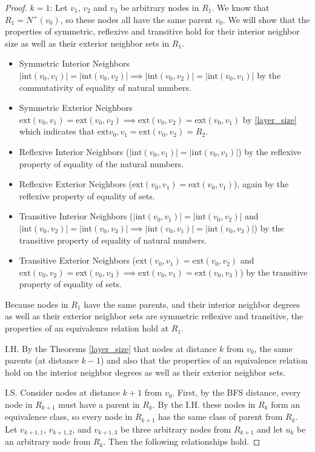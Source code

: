 \documentclass[AMS, Times1COL]{article} %
\theoremstyle{definition}
\begin{document}
\begin{proof}
		$k=1$: 
		Let $v_1$, $v_2$ and $v_3$ be arbitrary nodes in $R_1$. We know that $R_1 = N^+(v_0)$, so these nodes all have the same parent $v_0$. We will show that the properties of symmetric, reflexive and transitive hold for their interior neighbor size as well as their exterior neighbor sets in $R_1$. 
		\begin{itemize}
			\item Symmetric Interior Neighbors $|\text{int}(v_0, v_1)|=|\text{int}(v_0, v_2)| \implies  |\text{int}(v_0, v_2)|=|\text{int}(v_0, v_1)|$ by the commutativity of equality of natural numbers. 
			\item Symmetric Exterior Neighbors$\text{ext}(v_0, v_1)=\text{ext}(v_0, v_2) \implies  \text{ext}(v_0, v_2)=\text{ext}(v_0, v_1)$ by \ref{layer_size} which indicates that $\text{ext}{v_0, v_1} = \text{ext}(v_0, v_2) = R_2$. 
			\item Reflexive Interior Neighbors ($|\text{int}(v_0, v_1)|=|\text{int}(v_0, v_1)|$) by the reflexive property of equality of the natural numbers. 
			\item Reflexive Exterior Neighbors ($\text{ext}(v_0, v_1) = \text{ext}(v_0, v_1)$), again by the reflexive property of equality of sets. 
			\item Transitive Interior Neighbors ($|\text{int}(v_0, v_1)|=|\text{int}(v_0, v_2)|$ and $|\text{int}(v_0, v_2)|=|\text{int}(v_0, v_3)| \implies |\text{int}(v_0, v_1)|=|\text{int}(v_0, v_3)|$) by the transitive property of equality of natural numbers. 
			\item Transitive Exterior Neighbors ($\text{ext}(v_0, v_1)=\text{ext}(v_0, v_2)$ and $\text{ext}(v_0, v_2)=\text{ext}(v_0, v_3) \implies \text{ext}(v_0, v_1)=\text{ext}(v_0, v_3)$) by the transitive property of equality of sets. 
		\end{itemize}
		
		Because nodes in $R_1$ have the same parents, and their interior neighbor degrees as well as their exterior neighbor sets are symmetric reflexive and transitive, the properties of an equivalence relation hold at $R_1$. 
		
		I.H. 
		By the Theorems \ref{layer_size}   that nodes at distance $k$ from $v_0$, the same parents (at distance $k-1$) and also that the properties of an equivalence relation hold on the interior neighbor degrees as well as their exterior neighbor sets. 
		
		I.S. 
		Consider nodes at distance $k+1$ from $v_0$.
		First, by the BFS distance, every node in $R_{k+1}$ must have a parent in $R_k$. 
		By the I.H. these nodes in $R_k$ form an equivalence class, so every node in $R_{k+1}$ has the same class of parent from $R_k$. 
		Let $v_{k+1, 1}$, $v_{k+1, 2}$, and $v_{k+1, 3}$ be three arbitrary nodes from $R_{k+1}$ and let $u_k$ be an arbitrary node from $R_k$. 
		Then the following relationships hold. 
		

\end{proof}
\end{document}
